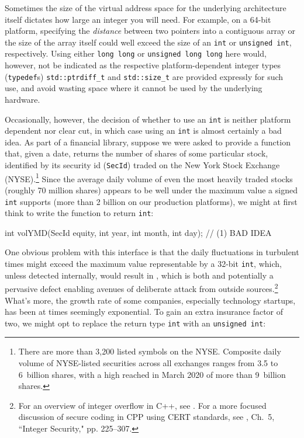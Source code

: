 Sometimes the size of the virtual address space for the
underlying architecture itself dictates how large an integer you will
need. For example, on a 64-bit platform, specifying the \emph{distance} between two pointers
into a contiguous array or the size of the array itself could well exceed the size of an \lstinline!int! or
\lstinline!unsigned!~\lstinline!int!, respectively. Using either
\lstinline!long!~\lstinline!long! or
\lstinline!unsigned!~\lstinline!long!~\lstinline!long! here would, however, not
be indicated as the respective platform-dependent integer types
(\lstinline!typedef!s) \lstinline!std::ptrdiff_t! and \lstinline!std::size_t!
are provided expressly for such use, and avoid wasting space where it
cannot be used by the underlying hardware.

Occasionally, however, the decision of whether to use an \lstinline!int! is
neither platform dependent nor clear cut, in which case using an
\lstinline!int! is almost certainly a bad idea. As part of a financial
library, suppose we were asked to provide a function that, given a date,
returns the number of shares of some particular stock, identified by its
security id (\lstinline!SecId!) traded on the New York Stock Exchange
(NYSE).\footnote{There are more than 3,200 listed symbols on the NYSE. Composite daily volume of NYSE-listed securities across all exchanges  ranges from 3.5 to 6~billion shares, with a high reached in March 2020 of more than 9~billion shares.} Since the average daily volume of even the most heavily traded stocks (roughly 70 million shares) appears to
be well under the maximum value a signed \lstinline!int! supports (more
than 2 billion on our production platforms), we might at first think to write the function
to return \lstinline!int!:

\begin{emcppslisting}[language=C++]
int volYMD(SecId equity, int year, int month, int day);  // (1) BAD IDEA
\end{emcppslisting}

\noindent One obvious problem with this interface is that the daily fluctuations
in turbulent times might exceed the maximum value representable by a
32-bit \lstinline!int!, which, unless detected internally, would result in
, which is both  and potentially a pervasive defect enabling avenues of deliberate attack from outside sources.{\cprotect\footnote{For an overview of integer overflow in C++, see \cite{ballman}. For a more focused discussion of secure coding in CPP using CERT standards, see \cite{seacord13}, Ch.~5, ``Integer Security," pp. 225--307.}} What's more, the growth rate of some companies,
especially technology startups, has
been at times seemingly exponential. To gain an extra
insurance factor of two, we might opt to replace the return type
\lstinline!int! with an \lstinline!unsigned!~\lstinline!int!:


